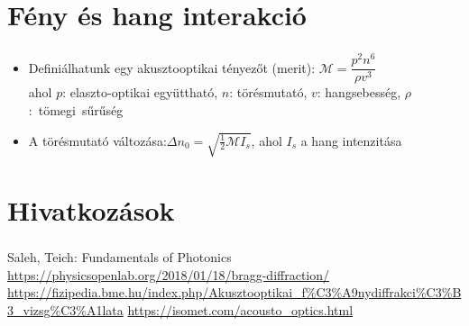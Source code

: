 \documentclass[aspectratio=169]{beamer}
\begin{document}
\section{Fény és hang interakció}
\begin{frame}
\frametitle{\secname}
\begin{itemize}
\item Definiálhatunk egy akusztooptikai tényezőt (merit): $\mathcal{M}=\dfrac{p^2n^6}{\rho v^3}$\\ahol $p$: elaszto-optikai együttható, $n$: törésmutató, $v$: hangsebesség, $\rho$:~tömegi~sűrűség
\item A törésmutató változása:$\Delta n_0=\sqrt{\frac{1}{2}\mathcal{M}I_s}$, ahol $I_s$ a hang intenzitása
\end{itemize}
\end{frame}

\section{Hivatkozások}
\begin{frame}
\frametitle{\secname}
\begin{thebibliography}{99}
\footnotesize
{} Saleh, Teich: Fundamentals of Photonics
 \url{https://physicsopenlab.org/2018/01/18/bragg-diffraction/}
 \url{https://fizipedia.bme.hu/index.php/Akusztooptikai_f\%C3\%A9nydiffrakci\%C3\%B3_vizsg\%C3\%A1lata}
 \url{https://isomet.com/acousto_optics.html}
\end{thebibliography}
\end{frame}
\end{document}
